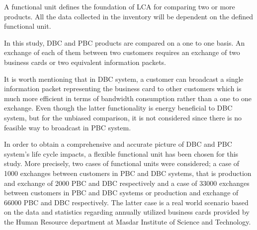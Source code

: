 \documentclass[conference]{IEEEtran}
\begin{document}
A functional unit defines the foundation of LCA for comparing two or more products. All the data collected in the inventory will be dependent on the defined functional unit.

In this study, DBC and PBC products are compared on a one to one basis. An exchange of each of them between two customers requires an exchange of two business cards or two equivalent information packets. 

It is worth mentioning that in DBC system, a customer can broadcast a single information packet representing the business card to other customers which is much more efficient in terms of bandwidth consumption rather than a one to one exchange. Even though the latter functionality is energy beneficial to DBC system, but for the unbiased comparison, it is not considered since there is no feasible way to broadcast in PBC system.

In order to obtain a comprehensive and accurate picture of DBC and PBC system's life cycle impacts, a flexible functional unit has been chosen for this study. More precisely, two cases of functional units were considered; a case of 1000 exchanges between customers in PBC and DBC systems, that is production and exchange of 2000 PBC and DBC respectively and a case of 33000 exchanges between customers in PBC and DBC systems or production and exchange of 66000 PBC and DBC respectively. The latter case is a real world scenario based on the data and statistics regarding annually utilized business cards provided by the Human Resource department at Masdar Institute of Science and Technology.  
\end{document}
